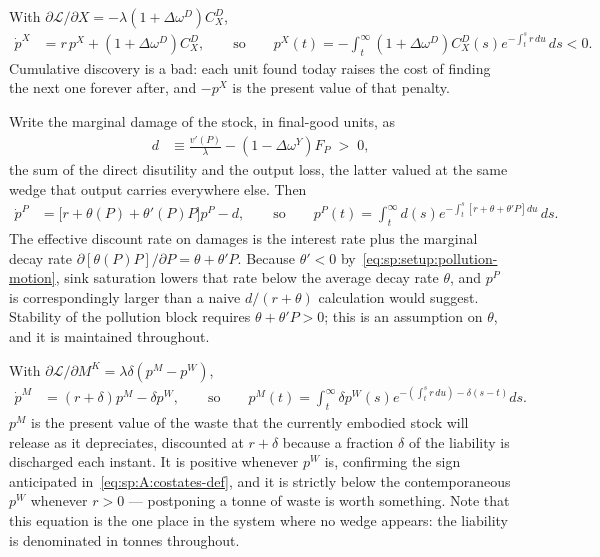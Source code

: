  With
$\partial\mathcal L/\partial X=-\lambda\left(1+\Delta\omega^D\right)C^D_X$,
\begin{align}
\dot p^X &= r\,p^X+\left(1+\Delta\omega^D\right)C^D_X,
\qquad\text{so}\qquad
p^X\left(t\right) = -\int_t^\infty \left(1+\Delta\omega^D\right)C^D_X\!\left(s\right)
e^{-\int_t^s r\,du}\,ds<0 .
\label{eq:sp:A:costate:X}
\end{align}
Cumulative discovery is a bad: each unit found today raises the cost of finding the next one forever
after, and $-p^X$ is the present value of that penalty.

 Write the marginal damage of the stock, in final-good units, as
\begin{align}
d &\equiv \frac{v'\!\left(P\right)}{\lambda}-\left(1-\Delta\omega^Y\right)F_P\;>\;0,
\label{eq:sp:A:damage}
\end{align}
the sum of the direct disutility and the output loss, the latter valued at the same wedge that
output carries everywhere else. Then
\begin{align}
\dot p^P &= \Big[r+\theta\!\left(P\right)+\theta'\!\left(P\right)P\Big]p^P-d,
\qquad\text{so}\qquad
p^P\left(t\right)=\int_t^\infty d\left(s\right)
e^{-\int_t^s\left[r+\theta+\theta'P\right]du}\,ds .
\label{eq:sp:A:costate:P}
\end{align}
The effective discount rate on damages is the interest rate plus the marginal decay rate
$\partial\left[\theta(P)P\right]/\partial P=\theta+\theta'P$. Because $\theta'<0$
by~\eqref{eq:sp:setup:pollution-motion}, sink saturation lowers that rate below the average decay rate
$\theta$, and $p^P$ is correspondingly larger than a naive $d/\left(r+\theta\right)$
calculation would suggest. Stability of the pollution block requires $\theta+\theta'P>0$; this is an
assumption on $\theta$, and it is maintained throughout.

 With
$\partial\mathcal L/\partial M^K=\lambda\delta\left(p^M-p^W\right)$,
\begin{align}
\dot p^M &= \left(r+\delta\right)p^M-\delta p^W,
\qquad\text{so}\qquad
p^M\left(t\right)=\int_t^\infty \delta p^W\!\left(s\right)
e^{-\left(\int_t^s r\,du\right)-\delta\left(s-t\right)}ds .
\label{eq:sp:A:costate:M}
\end{align}
$p^M$ is the present value of the waste that the currently embodied stock will release as it
depreciates, discounted at $r+\delta$ because a fraction $\delta$ of the liability is discharged each
instant. It is positive whenever $p^W$ is, confirming the sign anticipated
in~\eqref{eq:sp:A:costates-def}, and it is strictly below the contemporaneous $p^W$ whenever $r>0$ ---
postponing a tonne of waste is worth something. Note that this equation is the one place in the
system where no wedge appears: the liability is denominated in tonnes throughout.

